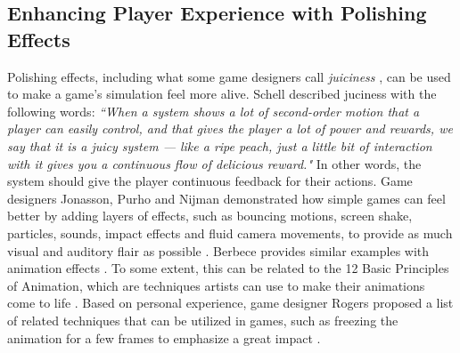 
\subsection{Enhancing Player Experience with Polishing Effects} \label{polishSection}
Polishing effects, including what some game designers call \textit{juiciness} \cite{juice3}, can be used to make a game's simulation feel more alive. Schell described juciness with the following words: \textit{``When a system shows a lot of second-order motion that a player can easily control, and that gives the player a lot of power and rewards, we say that it is a juicy system --- like a ripe peach, just a little bit of interaction with it gives you a continuous flow of delicious reward."} \cite{schell_art_2008} In other words, the system should give the player continuous feedback for their actions. Game designers Jonasson, Purho and Nijman demonstrated how simple games can feel better by adding layers of effects, such as bouncing motions, screen shake, particles, sounds, impact effects and fluid camera movements, to provide as much visual and auditory flair as possible \cite{juice1, juice2}. Berbece provides similar examples with animation effects \cite{animationSucks}. To some extent, this can be related to the 12 Basic Principles of Animation, which are techniques artists can use to make their animations come to life \cite{animation}. Based on personal experience, game designer Rogers proposed a list of related techniques that can be utilized in games, such as freezing the animation for a few frames to emphasize a great impact \cite{sticky}.

